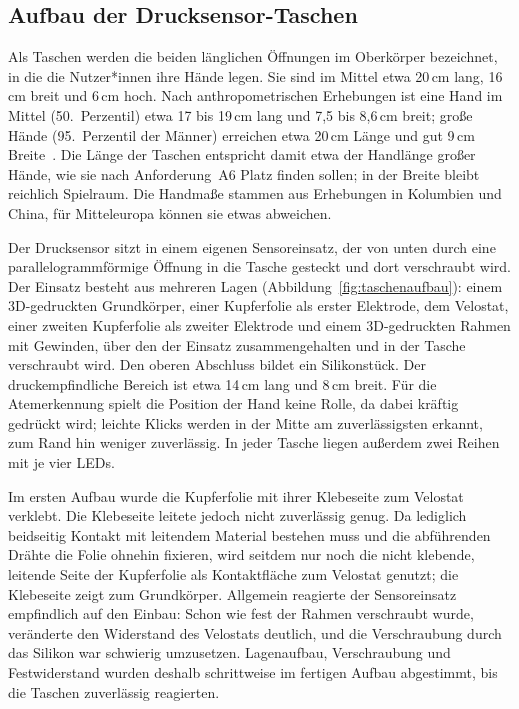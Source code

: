 \subsection{Aufbau der Drucksensor-Taschen}
\label{sec:hw_taschen}

Als Taschen werden die beiden länglichen Öffnungen im Oberkörper bezeichnet, in die die
Nutzer*innen ihre Hände legen. Sie sind im Mittel etwa 20\,cm lang, 16\,cm breit und 6\,cm hoch.
Nach anthropometrischen Erhebungen ist eine Hand im Mittel (50.~Perzentil) etwa 17 bis 19\,cm
lang und 7{,}5 bis 8{,}6\,cm breit; große Hände (95.~Perzentil der Männer) erreichen etwa 20\,cm
Länge und gut 9\,cm Breite~\cite[Tab.~1]{maldonado2023exhand}\cite[Tab.~3]{fu2022tfcc}. Die
Länge der Taschen entspricht damit etwa der Handlänge großer Hände, wie sie nach
Anforderung~A6 Platz finden sollen; in der Breite bleibt reichlich Spielraum. Die Handmaße
stammen aus Erhebungen in Kolumbien und China, für Mitteleuropa können sie etwas abweichen.

Der Drucksensor sitzt in einem eigenen Sensoreinsatz, der von
unten durch eine parallelogrammförmige Öffnung in die Tasche gesteckt und dort verschraubt wird.
Der Einsatz besteht aus mehreren Lagen (Abbildung~\ref{fig:taschenaufbau}): einem
3D-gedruckten Grundkörper, einer Kupferfolie als erster Elektrode, dem Velostat, einer zweiten
Kupferfolie als zweiter Elektrode und einem 3D-gedruckten Rahmen mit Gewinden, über den der
Einsatz zusammengehalten und in der Tasche verschraubt wird. Den oberen Abschluss bildet ein
Silikonstück. Der druckempfindliche Bereich ist etwa 14\,cm lang und 8\,cm breit. Für die
Atemerkennung spielt die Position der Hand keine Rolle, da dabei kräftig gedrückt wird; leichte
Klicks werden in der Mitte am zuverlässigsten erkannt, zum Rand hin weniger zuverlässig. In jeder
Tasche liegen außerdem zwei Reihen mit je vier \acp{LED}.

Im ersten Aufbau wurde die Kupferfolie mit ihrer Klebeseite zum Velostat verklebt. Die
Klebeseite leitete jedoch nicht zuverlässig genug. Da lediglich beidseitig Kontakt mit
leitendem Material bestehen muss und die abführenden Drähte die Folie ohnehin fixieren,
wird seitdem nur noch die nicht klebende, leitende Seite der Kupferfolie als Kontaktfläche zum
Velostat genutzt; die Klebeseite zeigt zum Grundkörper. Allgemein reagierte der Sensoreinsatz
empfindlich auf den Einbau: Schon wie fest der Rahmen verschraubt wurde, veränderte den
Widerstand des Velostats deutlich, und die Verschraubung durch das Silikon war schwierig
umzusetzen. Lagenaufbau, Verschraubung und Festwiderstand wurden deshalb schrittweise im
fertigen Aufbau abgestimmt, bis die Taschen zuverlässig reagierten.

